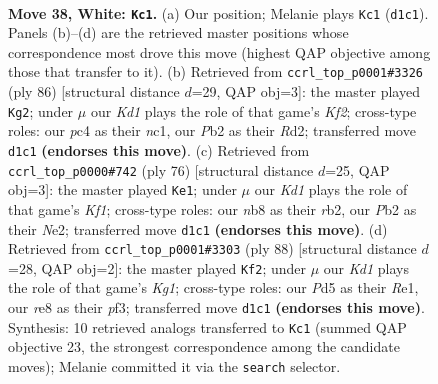 \documentclass[11pt]{article}
\begin{document}
\clearpage

\begin{figure}[p]\centering
\begin{subfigure}{0.46\textwidth}\centering
\resizebox{\linewidth}{!}{%
\newchessgame
\chessboard[
  setfen={1n2r3/5k2/1p1p4/1P1P4/p1p3P1/7P/1P5R/3K4 w - - 5 38},
  showmover=false,
  pgfstyle=straightmove, color=movearrow, markmove={d1-c1}
]}
\caption{}
\end{subfigure}\hfill
\begin{subfigure}{0.46\textwidth}\centering
\resizebox{\linewidth}{!}{%
\newchessgame
\chessboard[
  setfen={8/2p5/8/ppNPk2p/8/P5P1/1P1R1K2/2n4r w - - 2 44},
  showmover=false,
  pgfstyle=straightmove, color=movearrow, markmove={f2-g2}
]}
\caption{}
\end{subfigure}
\\[4pt]
\begin{subfigure}{0.46\textwidth}\centering
\resizebox{\linewidth}{!}{%
\newchessgame
\chessboard[
  setfen={8/4k1pp/4n3/p3P3/6P1/P1R4P/1r2N3/5K2 w - - 6 39},
  showmover=false,
  pgfstyle=straightmove, color=movearrow, markmove={f1-e1}
]}
\caption{}
\end{subfigure}\hfill
\begin{subfigure}{0.46\textwidth}\centering
\resizebox{\linewidth}{!}{%
\newchessgame
\chessboard[
  setfen={8/1pp5/3r4/3n2Bp/P2k4/1P3pP1/7P/4R1K1 w - - 0 45},
  showmover=false,
  pgfstyle=straightmove, color=movearrow, markmove={g1-f2}
]}
\caption{}
\end{subfigure}
\caption{\textbf{Move 38, White: \texttt{Kc1}.} (a) Our position; Melanie plays \texttt{Kc1} (\texttt{d1c1}). Panels (b)--(d) are the retrieved master positions whose correspondence most drove this move (highest QAP objective among those that transfer to it). (b) Retrieved from \texttt{ccrl\_top\_p0001\#3326} (ply 86) [structural distance $d$=29, QAP obj=3]: the master played \texttt{Kg2}; under $\mu$ our \emph{Kd1} plays the role of that game's \emph{Kf2}; cross-type roles: our \emph{p}c4 as their \emph{n}c1, our \emph{P}b2 as their \emph{R}d2; transferred move \texttt{d1c1} \textbf{(endorses this move)}. (c) Retrieved from \texttt{ccrl\_top\_p0000\#742} (ply 76) [structural distance $d$=25, QAP obj=3]: the master played \texttt{Ke1}; under $\mu$ our \emph{Kd1} plays the role of that game's \emph{Kf1}; cross-type roles: our \emph{n}b8 as their \emph{r}b2, our \emph{P}b2 as their \emph{N}e2; transferred move \texttt{d1c1} \textbf{(endorses this move)}. (d) Retrieved from \texttt{ccrl\_top\_p0001\#3303} (ply 88) [structural distance $d$=28, QAP obj=2]: the master played \texttt{Kf2}; under $\mu$ our \emph{Kd1} plays the role of that game's \emph{Kg1}; cross-type roles: our \emph{P}d5 as their \emph{R}e1, our \emph{r}e8 as their \emph{p}f3; transferred move \texttt{d1c1} \textbf{(endorses this move)}. Synthesis: 10 retrieved analogs transferred to \texttt{Kc1} (summed QAP objective 23, the strongest correspondence among the candidate moves); Melanie committed it via the \texttt{search} selector.}
\label{fig:thought-m74}
\end{figure}
\end{document}
